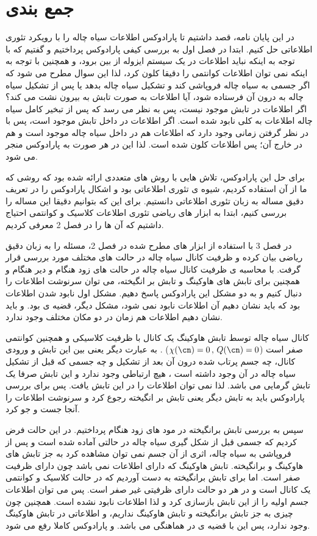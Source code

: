 \section{جمع بندی}
در این پایان نامه، قصد داشتیم تا پارادوکس اطلاعات سیاه چاله را با رویکرد تئوری اطلاعاتی حل کنیم. ابتدا در فصل اول به بررسی کیفی پارادوکس پرداختیم و گفتیم که با توجه به اینکه نباید اطلاعات در یک سیستم ایزوله از بین برود، و همچنین با توجه به اینکه  نمی توان اطلاعات کوانتمی را دقیقا کلون کرد، لذا این سوال مطرح می شود که اگر جسمی به سیاه چاله فروپاشی کند و تشکیل سیاه چاله بدهد یا پس از تشکیل سیاه چاله به درون آن فرستاده شود، آیا اطلاعات به صورت تابش به بیرون نشت می کند؟ اگر اطلاعات در تابش موجود نیست، پس به نظر می رسد که پس از تبخیر کامل سیاه چاله اطلاعات به کلی نابود شده است. اگر اطلاعات در داخل تابش موجود است، پس با در نظر گرفتن
زمانی وجود دارد که اطلاعات هم در داخل سیاه چاله موجود است و هم در خارج آن؛ پس اطلاعات کلون شده است. لذا این در هر صورت به پارادوکس منجر می شود. 

برای حل این پارادوکس، تلاش هایی با روش های متعددی ارائه شده بود که روشی  که ما از آن استفاده کردیم، شیوه ی تئوری اطلاعاتی بود و اشکال پارادوکس را در تعریف دقیق مساله به زبان تئوری اطلاعاتی دانستیم. برای این که بتوانیم دقیقا این مساله را بررسی کنیم، ابتدا به ابزار های ریاضی تئوری اطلاعات کلاسیک و کوانتمی احتیاج داشتیم که آن ها را در فصل 2 معرفی کردیم.

در فصل 3 با استفاده از ابزار های مطرح شده در فصل 2، مسئله را به زبان دقیق ریاضی بیان کرده و ظرفیت کانال سیاه چاله در حالت های مختلف مورد بررسی قرار گرفت. با محاسبه ی ظرفیت کانال سیاه چاله در حالت های زود هنگام و دیر هنگام و همچنین برای تابش های هاوکینگ و تابش بر انگیخته، می توان سرنوشت اطلاعات را دنبال کنیم و به دو مشکل این  پارادوکس پاسخ دهیم. مشکل اول نابود شدن اطلاعات بود که باید نشان دهیم آن اطلاعات نابود نمی شود، مشکل دیگر، قضیه ی 
بود. و باید نشان دهیم اطلاعات هم زمان در دو مکان مختلف وجود ندارد.


کانال سیاه چاله توسط تابش هاوکینگ یک کانال با ظرفیت کلاسیکی و همچنین کوانتمی صفر است 
($\chi(\cn) = 0 \, , \, Q(\cn) = 0$)
.
به عبارت دیگر یعنی بین این تابش و ورودی کانال، چه جسم پرتاب شده درون آن بعد از تشکیل و چه جسمی که قبل از تشکیل سیاه چاله در آن وجود داشته است ، هیچ ارتباطی وجود ندارد و این تابش صرفا یک تابش گرمایی می باشد. لذا نمی توان اطلاعات را در این تابش یافت. پس برای بررسی پارادوکس باید به تابش دیگر یعنی تابش بر انگیخته رجوع کرد و سرنوشت اطلاعات را آنجا جست و جو کرد.


سپس به بررسی تابش برانگیخته در مود های زود هنگام پرداختیم. در این حالت فرض کردیم که جسمی قبل از شکل گیری سیاه چاله در حالتی آماده شده است و پس از فروپاشی به سیاه چاله، اثری از آن جسم نمی توان مشاهده کرد به جز تابش های هاوکینگ و برانگیخته. تابش هاوکینگ که دارای اطلاعات نمی باشد چون دارای ظرفیت صفر است. اما برای تابش برانگیخته به دست آوردیم که در حالت کلاسیک و کوانتمی یک کانال 
است و در هر دو حالت دارای ظرفیتی غیر صفر  است.
پس می توان اطلاعات جسم اولیه را از این تابش بازسازی کرد و لذا اطلاعات نابود نشده است. همچنین چون چیزی به جز تابش برانگیخته و تابش هاوکینگ نداریم، و اطلاعاتی در تابش هاوکینگ وجود ندارد، پس این با قضیه ی 
در هماهنگی می باشد. و پارادوکس کاملا رفع می شود.



